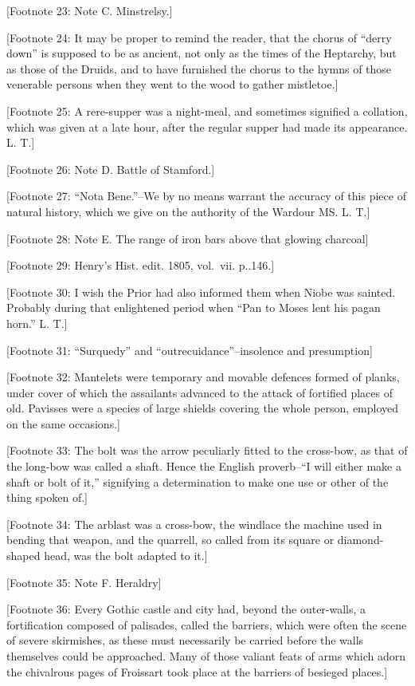 {[}Footnote 23: Note C. Minstrelsy.{]}

{[}Footnote 24: It may be proper to remind the reader, that the chorus
of ``derry down'' is supposed to be as ancient, not only as the times of
the Heptarchy, but as those of the Druids, and to have furnished the
chorus to the hymns of those venerable persons when they went to the
wood to gather mistletoe.{]}

{[}Footnote 25: A rere-supper was a night-meal, and sometimes signified
a collation, which was given at a late hour, after the regular supper
had made its appearance. L. T.{]}

{[}Footnote 26: Note D. Battle of Stamford.{]}

{[}Footnote 27: ``Nota Bene.''--We by no means warrant the accuracy of
this piece of natural history, which we give on the authority of the
Wardour MS. L. T.{]}

{[}Footnote 28: Note E. The range of iron bars above that glowing
charcoal{]}

{[}Footnote 29: Henry's Hist. edit. 1805, vol.~vii. p..146.{]}

{[}Footnote 30: I wish the Prior had also informed them when Niobe was
sainted. Probably during that enlightened period when ``Pan to Moses
lent his pagan horn.'' L. T.{]}

{[}Footnote 31: ``Surquedy'' and ``outrecuidance''--insolence and
presumption{]}

{[}Footnote 32: Mantelets were temporary and movable defences formed of
planks, under cover of which the assailants advanced to the attack of
fortified places of old. Pavisses were a species of large shields
covering the whole person, employed on the same occasions.{]}

{[}Footnote 33: The bolt was the arrow peculiarly fitted to the
cross-bow, as that of the long-bow was called a shaft. Hence the English
proverb--``I will either make a shaft or bolt of it,'' signifying a
determination to make one use or other of the thing spoken of.{]}

{[}Footnote 34: The arblast was a cross-bow, the windlace the machine
used in bending that weapon, and the quarrell, so called from its square
or diamond-shaped head, was the bolt adapted to it.{]}

{[}Footnote 35: Note F. Heraldry{]}

{[}Footnote 36: Every Gothic castle and city had, beyond the
outer-walls, a fortification composed of palisades, called the barriers,
which were often the scene of severe skirmishes, as these must
necessarily be carried before the walls themselves could be approached.
Many of those valiant feats of arms which adorn the chivalrous pages of
Froissart took place at the barriers of besieged places.{]}

